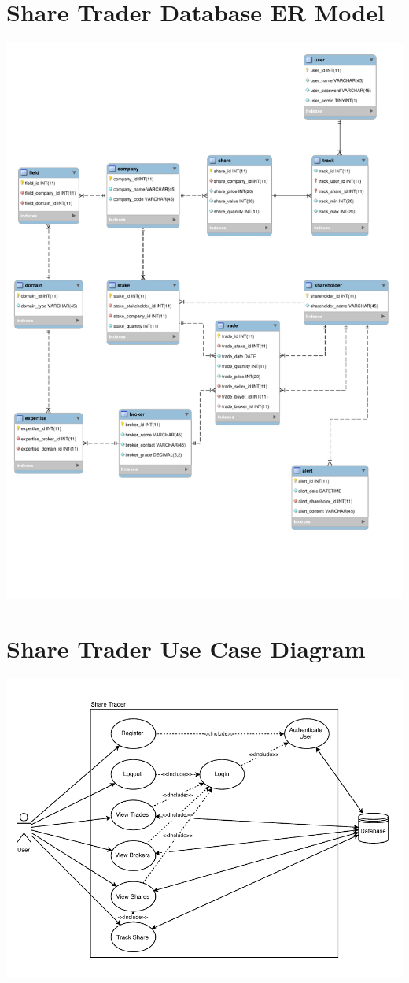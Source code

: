 \documentclass[12pt, a4paper,titlepage]{article}
\begin{document}
\section{Share Trader Database ER Model}
\includegraphics[width=\textwidth]{res/share_trader_er.pdf}
\label{ap-schema}


\section{Share Trader Use Case Diagram}
\includegraphics[width=\textwidth]{res/share_trader_uc.pdf}
\label{ap-uc}
\end{document}
